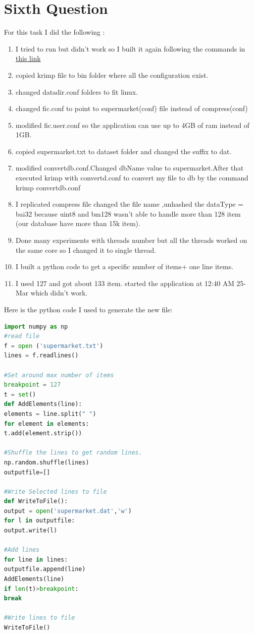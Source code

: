 \documentclass{article}
\begin{document}
\section*{Sixth Question}
For this task I did the following :
\begin{enumerate}
	\item I tried to run but didn't work so I built it again following the commands in \href{https://courses.cs.ut.ee/MTAT.03.183/2016_spring/uploads/Main/krimp_compilation.txt}{this link}
	\item copied krimp file to bin folder where all the configuration exist.
	\item changed datadir.conf folders to fit linux.
	\item changed fic.conf to point to supermarket(conf) file instead of compress(conf)
	\item modified fic.user.conf so the application can use up to 4GB of ram instead of 1GB.
	\item copied supermarket.txt to dataset folder and changed the suffix to dat.
	\item modified convertdb.conf.Changed dbName value to supermarket.After that executed krimp with convertd.conf to convert my file to db by the command krimp convertdb.conf
	\item I replicated compress file changed the file name ,unhashed the dataType = bai32 because uint8 and bm128 wasn't able to handle more than 128 item (our database have more than 15k item).
	\item Done many experiments with threads number but all the threads worked on the same core so I changed it to single thread.
	\item I built a python code to get a specific number of items+ one line items.
	\item I used 127 and got about 133 item. started the application at 12:40 AM 25-Mar which didn't work.
\end{enumerate}
Here is the python code I used to generate the new file:
\begin{lstlisting}[language=Python]
import numpy as np
#read file
f = open ('supermarket.txt')
lines = f.readlines()

#Set around max number of items
breakpoint = 127
t = set()
def AddElements(line):
elements = line.split(" ")
for element in elements:
t.add(element.strip())

#Shuffle the lines to get random lines.
np.random.shuffle(lines)
outputfile=[]

#Write Selected lines to file
def WriteToFile():
output = open('supermarket.dat','w')
for l in outputfile:
output.write(l)

#Add lines
for line in lines:
outputfile.append(line)
AddElements(line)
if len(t)>breakpoint:
break

#Write lines to file
WriteToFile()
\end{lstlisting}
\end{document}
